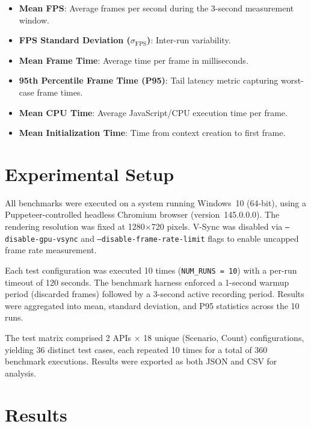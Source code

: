 \documentclass[conference]{IEEEtran}
\begin{document}
\begin{itemize}
    \item \textbf{Mean FPS}: Average frames per second during the 3-second measurement window.
    \item \textbf{FPS Standard Deviation ($\sigma_{\text{FPS}}$)}: Inter-run variability.
    \item \textbf{Mean Frame Time}: Average time per frame in milliseconds.
    \item \textbf{95th Percentile Frame Time (P95)}: Tail latency metric capturing worst-case frame times.
    \item \textbf{Mean CPU Time}: Average JavaScript/CPU execution time per frame.
    \item \textbf{Mean Initialization Time}: Time from context creation to first frame.
\end{itemize}

\section{Experimental Setup}
\label{sec:experimental}

All benchmarks were executed on a system running Windows~10 (64-bit), using a Puppeteer-controlled headless Chromium browser (version~145.0.0.0). The rendering resolution was fixed at 1280$\times$720 pixels. V-Sync was disabled via \texttt{--disable-gpu-vsync} and \texttt{--disable-frame-rate-limit} flags to enable uncapped frame rate measurement.

Each test configuration was executed 10 times (\texttt{NUM\_RUNS = 10}) with a per-run timeout of 120 seconds. The benchmark harness enforced a 1-second warmup period (discarded frames) followed by a 3-second active recording period. Results were aggregated into mean, standard deviation, and P95 statistics across the 10 runs.

The test matrix comprised 2 APIs $\times$ 18 unique (Scenario, Count) configurations, yielding 36 distinct test cases, each repeated 10 times for a total of 360 benchmark executions. Results were exported as both JSON and CSV for analysis.

\section{Results}
\label{sec:results}
\end{document}
